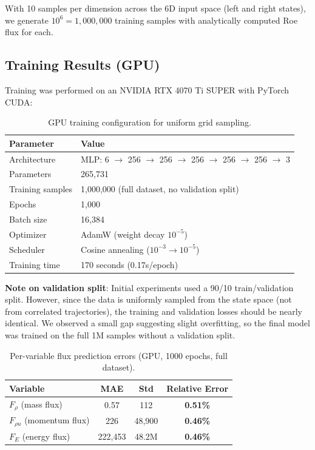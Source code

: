 \documentclass[11pt,a4paper]{article}
\begin{document}
With 10 samples per dimension across the 6D input space (left and right states), we generate $10^6 = 1{,}000{,}000$ training samples with analytically computed Roe flux for each.

\subsection{Training Results (GPU)}

Training was performed on an NVIDIA RTX 4070 Ti SUPER with PyTorch CUDA:

\begin{table}[H]
\centering
\begin{tabular}{ll}
\toprule
Parameter & Value \\
\midrule
Architecture & MLP: 6 $\rightarrow$ 256 $\rightarrow$ 256 $\rightarrow$ 256 $\rightarrow$ 256 $\rightarrow$ 256 $\rightarrow$ 3 \\
Parameters & 265,731 \\
Training samples & 1,000,000 (full dataset, no validation split) \\
Epochs & 1,000 \\
Batch size & 16,384 \\
Optimizer & AdamW (weight decay $10^{-5}$) \\
Scheduler & Cosine annealing ($10^{-3} \rightarrow 10^{-5}$) \\
Training time & 170 seconds (0.17s/epoch) \\
\bottomrule
\end{tabular}
\caption{GPU training configuration for uniform grid sampling.}
\label{tab:gpu_config}
\end{table}

\textbf{Note on validation split}: Initial experiments used a 90/10 train/validation split. However, since the data is uniformly sampled from the state space (not from correlated trajectories), the training and validation losses should be nearly identical. We observed a small gap suggesting slight overfitting, so the final model was trained on the full 1M samples without a validation split.

\begin{table}[H]
\centering
\begin{tabular}{lccc}
\toprule
Variable & MAE & Std & Relative Error \\
\midrule
$F_\rho$ (mass flux) & 0.57 & 112 & \textbf{0.51\%} \\
$F_{\rho u}$ (momentum flux) & 226 & 48,900 & \textbf{0.46\%} \\
$F_E$ (energy flux) & 222,453 & 48.2M & \textbf{0.46\%} \\
\bottomrule
\end{tabular}
\caption{Per-variable flux prediction errors (GPU, 1000 epochs, full dataset).}
\label{tab:flux_errors}
\end{table}
\end{document}
